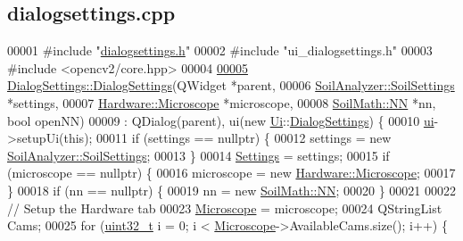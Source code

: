 \hypertarget{dialogsettings_8cpp_source}{}\subsection{dialogsettings.\+cpp}
\label{dialogsettings_8cpp_source}

\begin{DoxyCode}
00001 \textcolor{preprocessor}{#include "\hyperlink{dialogsettings_8h}{dialogsettings.h}"}
00002 \textcolor{preprocessor}{#include "ui\_dialogsettings.h"}
00003 \textcolor{preprocessor}{#include <opencv2/core.hpp>}
00004 
\hypertarget{dialogsettings_8cpp_source_l00005}{}\hyperlink{class_dialog_settings_a891cd177b754ee9249567759998ff47a}{00005} \hyperlink{class_dialog_settings_a891cd177b754ee9249567759998ff47a}{DialogSettings::DialogSettings}(QWidget *parent,
00006                                \hyperlink{class_soil_analyzer_1_1_soil_settings}{SoilAnalyzer::SoilSettings} *settings,
00007                                \hyperlink{class_hardware_1_1_microscope}{Hardware::Microscope} *microscope,
00008                                \hyperlink{class_soil_math_1_1_n_n}{SoilMath::NN} *nn, \textcolor{keywordtype}{bool} openNN)
00009     : QDialog(parent), ui(new \hyperlink{namespace_ui}{Ui}::\hyperlink{class_dialog_settings}{DialogSettings}) \{
00010   \hyperlink{class_dialog_settings_a5b53d91a27cdf68f77e4bdd10b6a9bba}{ui}->setupUi(\textcolor{keyword}{this});
00011   \textcolor{keywordflow}{if} (settings == \textcolor{keyword}{nullptr}) \{
00012     settings = \textcolor{keyword}{new} \hyperlink{class_soil_analyzer_1_1_soil_settings}{SoilAnalyzer::SoilSettings};
00013   \}
00014   \hyperlink{class_dialog_settings_ae6b9e42f9108f93c4964be28a7171648}{Settings} = settings;
00015   \textcolor{keywordflow}{if} (microscope == \textcolor{keyword}{nullptr}) \{
00016     microscope = \textcolor{keyword}{new} \hyperlink{class_hardware_1_1_microscope}{Hardware::Microscope};
00017   \}
00018   \textcolor{keywordflow}{if} (nn == \textcolor{keyword}{nullptr}) \{
00019     nn = \textcolor{keyword}{new} \hyperlink{class_soil_math_1_1_n_n}{SoilMath::NN};
00020   \}
00021 
00022   \textcolor{comment}{// Setup the Hardware tab}
00023   \hyperlink{class_microscope}{Microscope} = microscope;
00024   QStringList Cams;
00025   \textcolor{keywordflow}{for} (\hyperlink{_soil_math_types_8h_a435d1572bf3f880d55459d9805097f62}{uint32\_t} i = 0; i < \hyperlink{class_microscope}{Microscope}->AvailableCams.size(); i++) \{

\end{DoxyCode}
